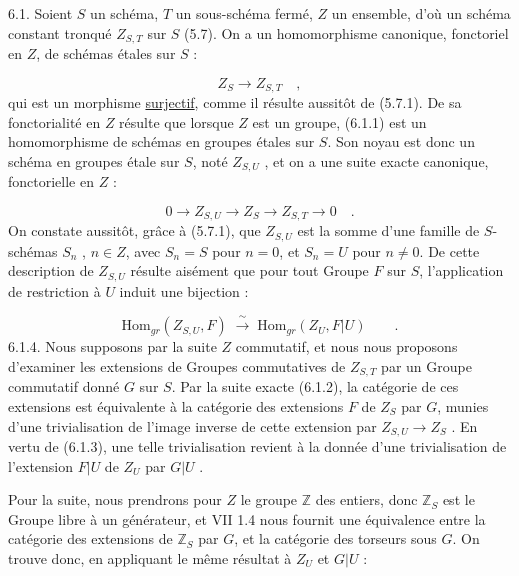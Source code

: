 6.1. Soient $S$ un schéma, $T$ un sous-schéma fermé, $Z$ un ensemble, d'où un schéma constant tronqué $Z_{S,T}$ sur $S$ (5.7). On a un homomorphisme canonique, fonctoriel en $Z$, de schémas étales sur $S$ :

\begin{equation}\tag{6.1.1}
Z_S \longrightarrow Z_{S,T} \quad ,
\end{equation}
qui est un morphisme \underline{surjectif}, comme il résulte aussitôt de (5.7.1). De sa fonctorialité en $Z$ résulte que lorsque $Z$ est un groupe, (6.1.1) est un homomorphisme de schémas en groupes étales sur $S$. Son noyau est donc un schéma en groupes étale sur $S$, noté $Z_{S,U}$ , et on a une suite exacte canonique, fonctorielle en $Z$ :

\begin{equation}\tag{6.1.2}
0 \longrightarrow Z_{S,U} \longrightarrow Z_S \longrightarrow Z_{S,T} \longrightarrow 0 \quad .
\end{equation}
On constate aussitôt, grâce à (5.7.1), que $Z_{S,U}$ est la somme d'une famille de $S$-schémas $S_n$ , $n \in Z$, avec $S_n = S$ pour $n = 0$, et $S_n = U$ pour $n \neq 0$. De cette description de $Z_{S,U}$ résulte aisément que pour tout
Groupe $F$ sur $S$, l'application de restriction à $U$ induit une bijection :

\begin{equation}\tag{6.1.3}
\mathrm{Hom}_{gr}(Z_{S,U},F) \;\xrightarrow{\,\sim\,}\; \mathrm{Hom}_{gr}(Z_U,F|U) \qquad .
\end{equation}
6.1.4. Nous supposons par la suite $Z$ commutatif, et nous nous proposons d'examiner les extensions de Groupes commutatives de $Z_{S,T}$ par un Groupe commutatif donné $G$ sur $S$. Par la suite exacte (6.1.2), la catégorie de ces extensions est équivalente à la catégorie des extensions $F$ de $Z_S$ par $G$, munies d'une trivialisation de l'image inverse de cette extension par $Z_{S,U} \longrightarrow Z_S$ . En vertu de (6.1.3), une telle trivialisation revient à la donnée d'une trivialisation de l'extension $F|U$ de $Z_U$ par $G|U$ .

Pour la suite, nous prendrons pour $Z$ le groupe $\mathbb{Z}$ des entiers, donc $\mathbb{Z}_S$ est le Groupe libre à un générateur, et VII 1.4 nous fournit une équivalence entre la catégorie des extensions de $\mathbb{Z}_S$ par $G$, et la catégorie des torseurs sous $G$. On trouve donc, en appliquant le même résultat à $Z_U$ et $G|U$ :

